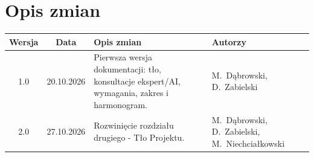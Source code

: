 \section{Opis zmian}

\begin{table}[H]
\centering
\small
\begin{tabularx}{\textwidth}{|c|c|X|p{3.2cm}|}
\hline
\textbf{Wersja} & \textbf{Data} & \textbf{Opis zmian} & \textbf{Autorzy} \\
\hline
1.0 & 20.10.2026 & Pierwsza wersja dokumentacji: tło, konsultacje ekspert/AI, wymagania, zakres i harmonogram. & M.\ Dąbrowski, D.\ Zabielski \\
\hline
2.0 & 27.10.2026 & Rozwinięcie rozdziału drugiego - Tło Projektu. & M.\ Dąbrowski, D.\ Zabielski, M.\ Niechciałkowski \\
\hline
\end{tabularx}
\end{table}
